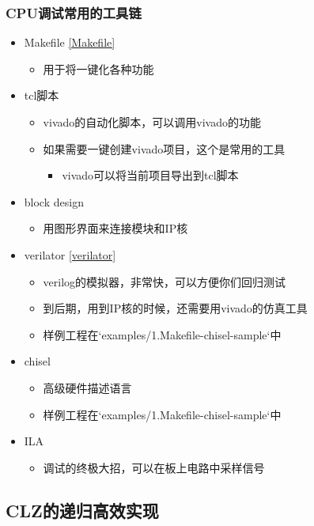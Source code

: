 \documentclass[lang=cn,11pt,a4paper]{elegantpaper}
\begin{document}
\subsubsection{CPU调试常用的工具链}
\begin{itemize}
\item Makefile \ref{Makefile}
  \begin{itemize}
  \item 用于将一键化各种功能
  \end{itemize}
\item tcl脚本
  \begin{itemize}
  \item vivado的自动化脚本，可以调用vivado的功能
  \item 如果需要一键创建vivado项目，这个是常用的工具
    \begin{itemize}
    \item vivado可以将当前项目导出到tcl脚本
    \end{itemize}
  \end{itemize}
\item block design
  \begin{itemize}
  \item 用图形界面来连接模块和IP核
  \end{itemize}
\item verilator \ref{verilator}
  \begin{itemize}
  \item verilog的模拟器，非常快，可以方便你们回归测试
  \item 到后期，用到IP核的时候，还需要用vivado的仿真工具
  \item 样例工程在`examples/1.Makefile-chisel-sample`中
  \end{itemize}
\item chisel
  \begin{itemize}
  \item 高级硬件描述语言
  \item 样例工程在`examples/1.Makefile-chisel-sample`中
  \end{itemize}
\item ILA
  \begin{itemize}
  \item 调试的终极大招，可以在板上电路中采样信号
  \end{itemize}
\end{itemize}

\subsection{CLZ的递归高效实现}
\end{document}

